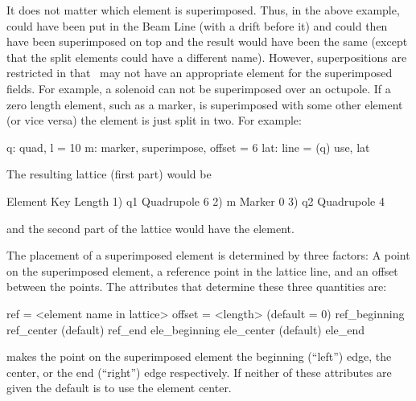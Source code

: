 It does not matter which element is superimposed. Thus, in the above
example,  could have been put in the Beam Line (with a drift
before it) and  could then have been superimposed on top and the
result would have been the same (except that the split elements could
have a different name). However, superpositions are restricted in that
\bmad\ may not have an appropriate element for the superimposed
fields. For example, a solenoid can not be superimposed over an
octupole.  If a zero length element, such as a marker, is superimposed
with some other element (or vice versa) the element is just split in
two. For example:
\begin{example}
  q: quad, l = 10
  m: marker, superimpose, offset = 6
  lat: line = (q)
  use, lat
\end{example}
The resulting lattice (first part) would be
\begin{example}
        Element   Key           Length
  1)    q{\B}1       Quadrupole    6
  2)    m         Marker        0
  3)    q{\B}2       Quadrupole    4
\end{example}
and the second part of the lattice would have the  element.
 
The placement of a superimposed element is determined by three
factors: A point on the superimposed element, a reference point in the
lattice line, and an offset between the points. The attributes that
determine these three quantities are:
\begin{example}
  ref = <element name in lattice>
  offset = <length>      (default = 0)
  ref_beginning
  ref_center             (default)
  ref_end
  ele_beginning
  ele_center             (default)
  ele_end
\end{example}
   makes the point on the superimposed element 
the beginning (``left'') edge, the center, or the end (``right'') edge respectively.
If neither of these attributes are given the default is to use the element center.


